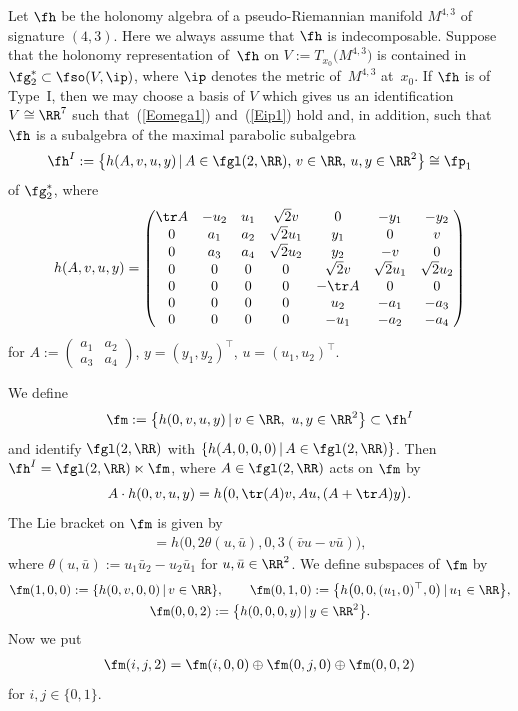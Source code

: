 Let $\fh$ be the holonomy algebra of a pseudo-Riemannian manifold $M^{4,3}$ of signature $(4,3)$. Here we always assume that $\fh$ is indecomposable. Suppose that the holonomy representation of~$\fh$ on $V:=T_{x_0}\big(M^{4,3}\big)$ is contained in $\fg_2^*\subset \fso(V,\ip)$, where $\ip$ denotes the metric of~$M^{4,3}$ at~$x_0$. If $\fh$ is of Type~I, then we may choose a basis of $V$ which gives us an identification $V\cong\RR^7$ such that~(\ref{Eomega1}) and~(\ref{Eip1}) hold and, in addition, such that~$\fh$ is a subalgebra of the maximal parabolic subalgebra
\begin{gather}\label{EhI}
\fh^I:=\big\{ h(A,v,u,y)\,|\, A\in\fgl(2,\RR),\, v\in\RR,\, u, y \in\RR^2\big\}\cong \fp_1
\end{gather}
of $\fg_2^*$, where
\begin{gather*}h(A,v, u,y)= \left(
\begin{matrix}
\tr A &-u_2&u_1&\sqrt 2 v&0&-y_1&-y_2\\
0&a_1&a_2&\sqrt 2 u_1&y_1&0&v\\
0&a_3&a_4&\sqrt 2 u_2&y_2&-v&0\\
0&0&0&0&\sqrt 2 v&\sqrt 2 u_1&\sqrt 2 u_2\\
0&0&0&0&-\tr A&0&0\\
0&0&0&0&u_2&-a_1&-a_3\\
0&0&0&0&-u_1&-a_2&-a_4
	\end{matrix}\right)\end{gather*}
for	$ A:=\left(\begin{smallmatrix} a_1&a_2\\a_3&a_4\end{smallmatrix}\right)$, $y=(y_1,y_2)^\top$, $u=(u_1,u_2)^\top$.

We define
\begin{gather*} \fm:=\big\{h(0,v,u,y)\,|\, v\in\RR,\ u, y \in\RR^2\big\}\subset \fh^I\end{gather*}
and identify $\fgl(2,\RR)$ with $\{h(A,0,0,0)\,|\, A\in \fgl(2,\RR)\}$. Then $\fh^I=\fgl(2,\RR)\ltimes \fm$, where $A\in\fgl(2,\RR)$ acts on $\fm$ by
\begin{gather*}
A\cdot h(0,v,u,y)= h\big(0,\tr(A)v,Au,(A+\tr A)y\big).
\end{gather*}
The Lie bracket on $\fm$ is given by
\begin{gather*}
[h(0,v,u,y),h(0,\bar v,\bar u,\bar y)]=h\big(0,2\theta(u,\bar u),0,3(\bar v u-v\bar u)\big),
\end{gather*}
where $\theta(u,\bar u):=u_1\bar u_2-u_2\bar u_1$ for $u,\bar u\in\RR^2$. We define subspaces of $\fm$ by
\begin{gather*}
\fm(1,0,0):= \{h(0,v,0,0)\,|\, v\in\RR\},\qquad
\fm(0,1,0):= \big\{h\big(0,0,(u_1,0)^\top, 0\big)\,|\, u_1\in\RR\big\},\\
\fm(0,0,2):= \big\{h(0,0,0, y)\,|\, y\in\RR^2\big\}.
\end{gather*}
Now we put
\begin{gather*}\fm(i,j,2)= \fm(i,0,0)\oplus\fm(0,j,0)\oplus \fm(0,0,2)\end{gather*}
for $i,j\in\{0,1\}$.

